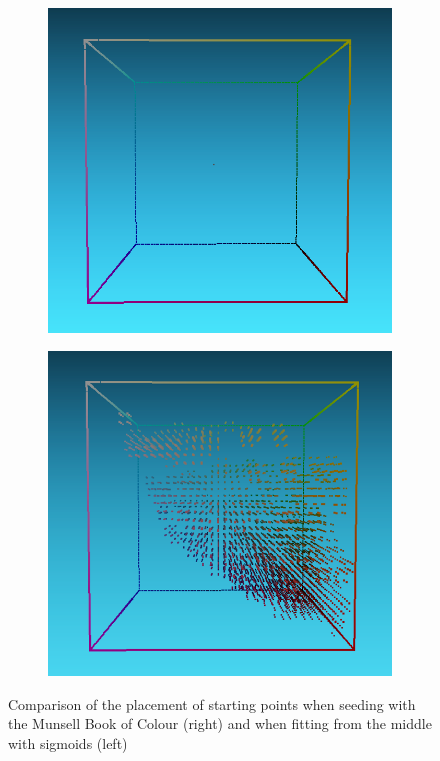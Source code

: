 \begin{figure}[t]
	\centering
	\captionsetup[subfigure]{font=footnotesize,labelfont=footnotesize}
	\captionsetup[subfigure]{justification=centering}
	\begin{subfigure}[t]{0.45\textwidth}
		\includegraphics[width=\linewidth]{img/seededStarting_sigmoid.png}
		\label{fig:seededStarting_sigmoid}
	\end{subfigure} \hspace{0.2em}
	\begin{subfigure}[t]{0.45\textwidth}
		\includegraphics[width=\linewidth]{img/seededStarting_mcb.png}
		\label{fig:seededStarting_mcb}
	\end{subfigure}
	\caption{Comparison of the placement of starting points when seeding with the Munsell Book of Colour (right) and when fitting from the middle with sigmoids (left)}
	\label{fig:seededStartingPoints}
\end{figure}

